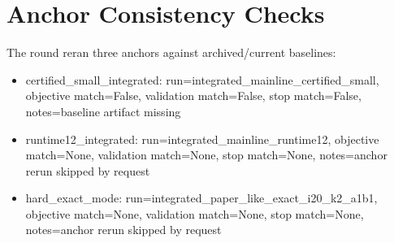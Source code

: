 \documentclass[11pt]{article}
\begin{document}
\section*{Anchor Consistency Checks}
The round reran three anchors against archived/current baselines:
\begin{center}
\begin{itemize}
\item certified\_small\_integrated: run=integrated\_mainline\_certified\_small, objective match=False, validation match=False, stop match=False, notes=baseline artifact missing
\item runtime12\_integrated: run=integrated\_mainline\_runtime12, objective match=None, validation match=None, stop match=None, notes=anchor rerun skipped by request
\item hard\_exact\_mode: run=integrated\_paper\_like\_exact\_i20\_k2\_a1b1, objective match=None, validation match=None, stop match=None, notes=anchor rerun skipped by request
\end{itemize}
\end{center}
\end{document}
